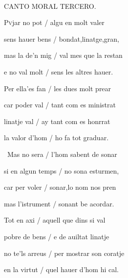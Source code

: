\documentclass[12pt]{article}
\renewcommand{\espaiAbansEtiquetaPoema}{\vspace{0ex}}
\begin{document}
\begin{estrofa}

\espaiAbansEtiquetaPoema

\\

\begin{rubrica}

CANTO MORAL TERCERO.

\end{rubrica}

\end{estrofa}


\begin{estrofa}

 P\textsc{v}jar no pot / algu en molt valer

 sens hauer bens / bondat,linatge,gran,

 mas la de'n mig / val mes que la restan

 e no val molt / sens les altres hauer.

 Per ella'es fan / les dues molt prear

 car poder val / tant com es ministrat

 linatje val / ay tant com es honrrat

 la valor d'hom / ho fa tot graduar.

\end{estrofa}



\begin{estrofa}

 \textparagraph\  Mas no sera / l'hom sabent de sonar

 si en algun temps / no sona esturmen,

 car per voler / sonar,lo nom nos pren

 mas l'istrument / sonant be acordar.

 Tot en axi / aquell que dins si val

 pobre de bens / e de auiltat linatje

 no te'ls arreus / per mostrar son coratje

 en la virtut / quel hauer d'hom hi cal.

\end{estrofa}
\end{document}
